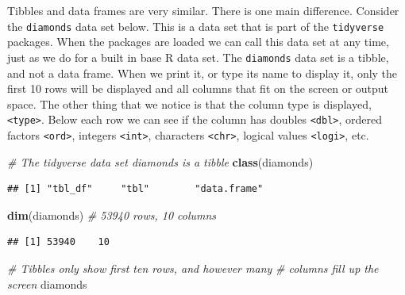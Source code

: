 \documentclass[
]{book}
\newenvironment{Shaded}{\begin{snugshade}}{\end{snugshade}}
\newcommand{\CommentTok}[1]{\textcolor[rgb]{0.56,0.35,0.01}{\textit{#1}}}
\newcommand{\KeywordTok}[1]{\textcolor[rgb]{0.13,0.29,0.53}{\textbf{#1}}}
\newcommand{\NormalTok}[1]{#1}
\begin{document}
Tibbles and data frames are very similar. There is one main difference. Consider the \texttt{diamonds} data set below. This is a data set that is part of the \texttt{tidyverse} packages. When the packages are loaded we can call this data set at any time, just as we do for a built in base R data set. The \texttt{diamonds} data set is a tibble, and not a data frame. When we print it, or type its name to display it, only the first 10 rows will be displayed and all columns that fit on the screen or output space. The other thing that we notice is that the column type is displayed, \texttt{\textless{}type\textgreater{}}. Below each row we can see if the column has doubles \texttt{\textless{}dbl\textgreater{}}, ordered factors \texttt{\textless{}ord\textgreater{}}, integers \texttt{\textless{}int\textgreater{}}, characters \texttt{\textless{}chr\textgreater{}}, logical values \texttt{\textless{}logi\textgreater{}}, etc.

\begin{Shaded}
\begin{Highlighting}[]
\CommentTok{# The tidyverse data set diamonds is a tibble}
\KeywordTok{class}\NormalTok{(diamonds)}
\end{Highlighting}
\end{Shaded}

\begin{verbatim}
## [1] "tbl_df"     "tbl"        "data.frame"
\end{verbatim}

\begin{Shaded}
\begin{Highlighting}[]
\KeywordTok{dim}\NormalTok{(diamonds)  }\CommentTok{# 53940 rows, 10 columns }
\end{Highlighting}
\end{Shaded}

\begin{verbatim}
## [1] 53940    10
\end{verbatim}

\begin{Shaded}
\begin{Highlighting}[]
\CommentTok{# Tibbles only show first ten rows, and however many}
\CommentTok{# columns fill up the screen}
\NormalTok{diamonds}
\end{Highlighting}
\end{Shaded}
\end{document}
